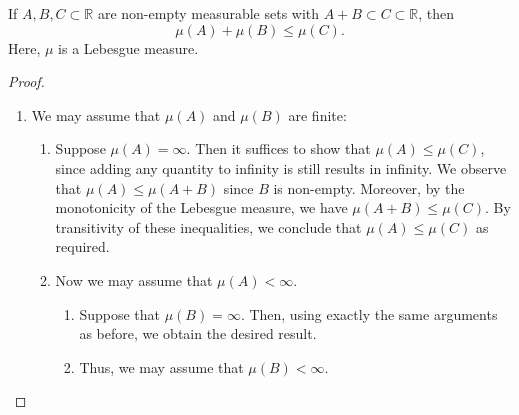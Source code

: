 \begin{theorem}
    \label{thm:one-dim}
    If \(A, B, C \subset \mathbb{R}\) are non-empty measurable sets with \(A+B\subset C \subset \mathbb{R}\), then
    \begin{equation*}
        \mu(A) + \mu(B) \leq \mu(C).
    \end{equation*}
    Here, \(\mu\) is a Lebesgue measure.
\end{theorem}

\begin{proof}
    \begin{enumerate}
        \item We may assume that \(\mu(A)\) and \(\mu(B)\) are finite:

        \begin{enumerate}
            \item Suppose \(\mu(A) = \infty\). Then it suffices to show that \(\mu(A) \leq \mu(C)\),
            since adding any quantity to infinity is still results in infinity. 
            We observe that \(\mu(A) \leq \mu(A+B)\) since \(B\) is non-empty.
            Moreover, by the monotonicity of the Lebesgue measure, we have \(\mu (A+B) \leq \mu(C)\).
            By transitivity of these inequalities, we conclude that \(\mu(A) \leq \mu(C)\) as required.

            \item Now we may assume that \(\mu(A) < \infty\).
            \begin{enumerate}
                \item Suppose that \(\mu(B) = \infty\). 
                Then, using exactly the same arguments as before, we obtain the desired result. 
                \item Thus, we may assume that \(\mu(B) < \infty\).
            \end{enumerate}
        \end{enumerate}


\end{enumerate}
\end{proof}

